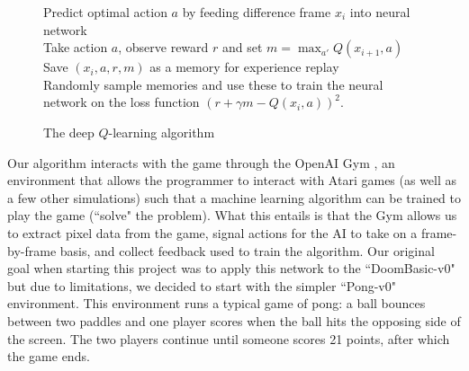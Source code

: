 \documentclass[12pt]{article}
\theoremstyle{plain}
\theoremstyle{definition}
\theoremstyle{remark}
\theoremstyle{plain}
\begin{document}
\begin{figure}
\begin{algorithm}[H]
\caption{The deep $Q$-learning algorithm}\label{qlearning}
\vspace{20pt}
Predict optimal action $a$ by feeding difference frame $x_i$ into neural network\\
Take action $a$, observe reward $r$ and set $m=\max_{a'} Q(x_{i+1},a)$\\
Save $(x_i, a,r, m)$ as a memory for experience replay\\
Randomly sample memories and use these to train the neural network on the loss function $(r+\gamma m-Q(x_i,a))^2$.

\vspace{20pt}
\end{algorithm}
\end{figure}

\par
Our algorithm interacts with the game through the OpenAI Gym \cite{openai}, an environment that allows the programmer to interact with Atari games (as well as a few other simulations) such that a machine learning algorithm can be trained to play the game (``solve" the problem).  What this entails is that the Gym allows us to extract pixel data from the game, signal actions for the AI to take on a frame-by-frame basis, and collect feedback used to train the algorithm.  Our original goal when starting this project was to apply this network to the ``DoomBasic-v0" \cite{doom} but due to limitations, we decided to start with the simpler ``Pong-v0" \cite{pong} environment.  This environment runs a typical game of pong: a ball bounces between two paddles and one player scores when the ball hits the opposing side of the screen.  The two players continue until someone scores 21 points, after which the game ends.
\end{document}
